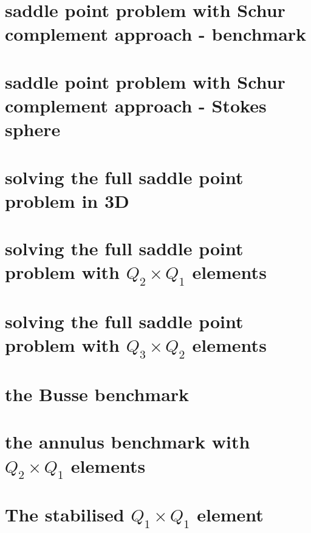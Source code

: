\documentclass[a4paper,11pt]{report}
\begin{document}
\chapter{saddle point problem with Schur complement approach - benchmark \label{f15}}


\chapter{saddle point problem with Schur complement approach - Stokes sphere \label{f16}}

\chapter{solving the full saddle point problem in 3D \label{f17}}

\chapter{solving the full saddle point problem with $Q_2\times Q_1$ elements \label{f18}}


\chapter{solving the full saddle point problem with $Q_3\times Q_2$ elements \label{f19}}


\chapter{the Busse benchmark \label{f20}}


\chapter{the annulus benchmark with $Q_2\times Q_1$ elements \label{f21}}

\chapter{The stabilised $Q_1 \times Q_1$ element \label{f22}} 

\end{document}
